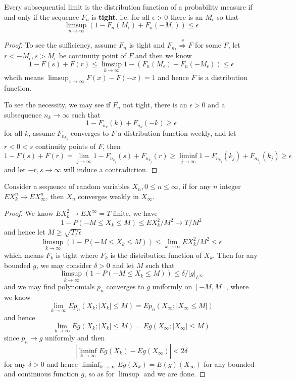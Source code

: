 \begin{theorem}
    Every subsequential limit is the distribution function of a probability measure if and only if the sequence $F_n$ is \textbf{tight}, i.e. for all $\epsilon > 0$ there is an $M_{\epsilon}$ so that
    \[
    \limsup\limits_{n\to\infty} (1 - F_n(M_{\epsilon}) + F_n(-M_{\epsilon})) \leq \epsilon
    \]
\end{theorem}
\begin{proof}
    To see the sufficiency, assume $F_n$ is tight and $F_{n_k} \overset{v}{\Rightarrow} F$ for some $F$, let $r < -M_{\epsilon}, s > M_{\epsilon}$ be continuity point of $F$ and then we know
    \[
    1 - F(s) + F(r) \leq \limsup_{k\to\infty} 1 - (F_n(M_{\epsilon}) - F_n(-M_{\epsilon})) \leq \epsilon
    \]
    whcih means $\limsup_{x\to\infty} F(x) - F(-x) = 1$ and hence $F$ is a distribution function.\par
    To see the necessity, we may see if $F_n$ not tight, there is an $\epsilon > 0$ and a subsequence $n_k \to \infty$ such that
    \[
    1 - F_{n_k}(k) + F_{n_k}(-k) \geq \epsilon
    \]
    for all $k$, assume $F_{n_{k_j}}$ converges to $F$ a distribution function weekly, and let $r < 0 <s$ continuity points of $F$, then
    \[
    1 - F(s) + F(r) = \lim_{j\to\infty} 1 - F_{n_{k_j}} (s) + F_{n_{k_j}} (r) \geq \liminf_{j\to\infty} 1 - F_{n_{k_j}} (k_j) + F_{n_{k_j}} (k_j) \geq \epsilon 
    \]
    and let $-r,s\to\infty$ will induce a contradiction.
\end{proof}

\begin{theorem}
    Consider a sequence of random variables $X_n, 0\leq n\leq \infty$, if for any $n$ integer $EX_k^n \to EX_{\infty}^n$, then $X_n$ converges weakly in $X_{\infty}$.
\end{theorem}
\begin{proof}
    We know $EX_k^2 \to EX^{\infty} = T$ finite, we have
    \[
    1 - P(-M \leq X_k \leq M) \leq EX_k^2/M^2 \to T/M^2
    \]
    and hence let $M \geq \sqrt{T/\epsilon}$
    \[
    \limsup_{k\to\infty} (1 - P(-M \leq X_k \leq M)) \leq \lim_{k\to\infty}EX_k^2/M^2 \leq \epsilon
    \]
    which means $F_k$ is tight where $F_k$ is the distribution function of $X_k$. Then for any bounded $g$, we may consider $\delta > 0$ and let $M$ such that 
    \[
    \limsup_{k\to\infty}(1 - P(-M \leq X_k \leq M)) \leq \delta/|g|_{L^{\infty}}
    \]
    and we may find polynomials $p_n$ converges to $g$ uniformly on $[-M,M]$, where we know
    \[\lim_{k\to\infty}Ep_n(X_k;|X_k|\leq M) = Ep_n(X_{\infty};|X_{\infty} \leq M|)\]
    and hence
    \[
    \lim_{k\to\infty}Eg(X_k;|X_k| \leq M) = Eg(X_{\infty};|X_{\infty}| \leq M) 
    \]
    since $p_n \to g$ uniformly and then
    \[
    |\liminf_{k\to\infty}Eg(X_k) - Eg(X_{\infty})| < 2\delta
    \]
    for any $\delta > 0$ and hence $\liminf_{k\to\infty}Eg(X_k) = E(g)(X_{\infty})$ for any bounded and continuous function $g$, so as for $\limsup$ and we are done.
\end{proof}

